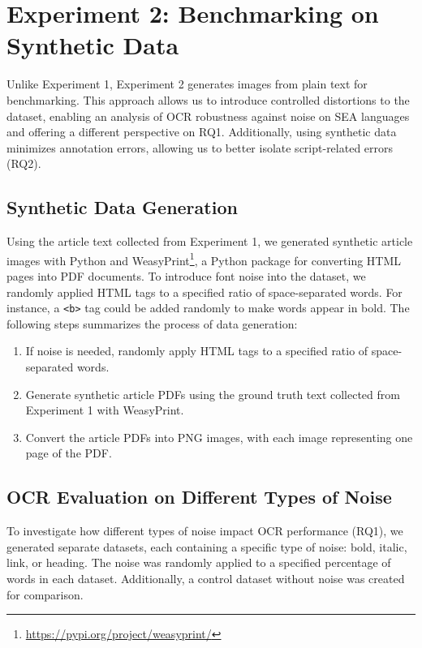 \documentclass[12pt,oneside]{memoir}
\begin{document}

\section{Experiment 2: Benchmarking on Synthetic Data}

Unlike Experiment 1, Experiment 2 generates images from plain text for benchmarking. 
This approach allows us to introduce controlled distortions to the dataset, enabling an analysis of OCR robustness against noise on SEA languages and offering a different perspective on RQ1.
Additionally, using synthetic data minimizes annotation errors, allowing us to better isolate script-related errors (RQ2).

\subsection{Synthetic Data Generation}

Using the article text collected from Experiment 1, we generated synthetic article images with Python and WeasyPrint\footnote{\url{https://pypi.org/project/weasyprint/}}, a Python package for converting HTML pages into PDF documents.
To introduce font noise into the dataset, we randomly applied HTML tags to a specified ratio of space-separated words.
For instance, a \texttt{<b>} tag could be added randomly to make words appear in bold.
The following steps summarizes the process of data generation:

\begin{enumerate}
    \item If noise is needed, randomly apply HTML tags to a specified ratio of space-separated words.
    \item Generate synthetic article PDFs using the ground truth text collected from Experiment 1 with WeasyPrint.
    \item Convert the article PDFs into PNG images, with each image representing one page of the PDF.
\end{enumerate}

\subsection{OCR Evaluation on Different Types of Noise}

To investigate how different types of noise impact OCR performance (RQ1), we generated separate datasets, each containing a specific type of noise: bold, italic, link, or heading. 
The noise was randomly applied to a specified percentage of words in each dataset. 
Additionally, a control dataset without noise was created for comparison.
\end{document}
